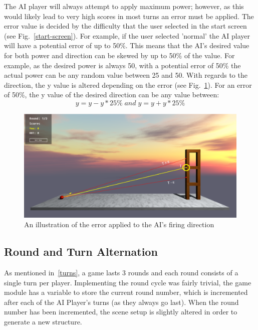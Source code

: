 \documentclass[runningheads]{llncs}
\begin{document}
	The AI player will always attempt to apply maximum power; however, as this would likely lead to very high scores in most turns an error must be applied. The error value is decided by the difficulty that the user selected in the start screen (see Fig.~\ref{start-screen}). For example, if the user selected 'normal' the AI player will have a potential error of up to 50\%. This means that the AI's desired value for both power and direction can be skewed by up to 50\% of the value. For example, as the desired power is always 50, with a potential error of 50\% the actual power can be any random value between 25 and 50. With regards to the direction, the y value is altered depending on the error (see Fig.~\ref{direction-error}). For an error of 50\%, the y value of the desired direction can be any value between:
	\begin{equation}
	y = y - y * 25\% \; and \; y = y + y * 25\% 
	\end{equation}
	
	\newpage
	\begin{figure}
		\centering
		\includegraphics[width=\textwidth]{./img/direction-error.png}
		\caption{An illustration of the error applied to the AI's firing direction}
		\label{direction-error}
	\end{figure} 
	
	\subsection{Round and Turn Alternation}
	As mentioned in~\ref{turns}, a game lasts 3 rounds and each round consists of a single turn per player. Implementing the round cycle was fairly trivial, the game module has a variable to store the current round number, which is incremented after each of the AI Player's turns (as they always go last). When the round number has been incremented, the scene setup is slightly altered in order to generate a new structure.
	
\end{document}

